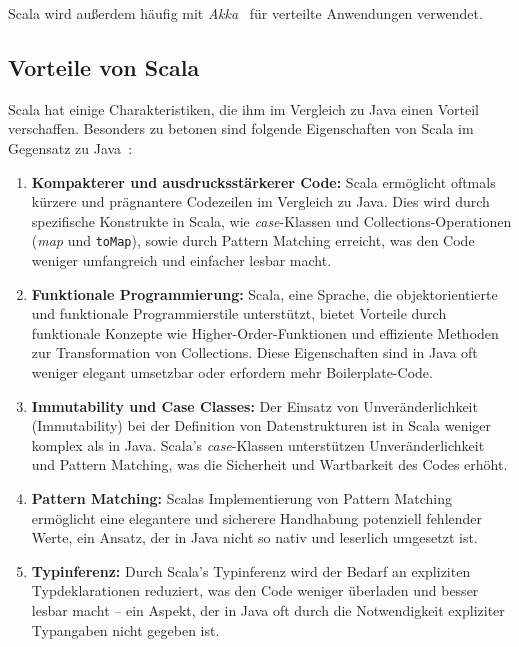 Scala wird außerdem häufig mit \emph{Akka}~\cite{lightbend_akka_nodate} für verteilte Anwendungen verwendet.

\subsection{Vorteile von Scala}
Scala hat einige Charakteristiken, die ihm im Vergleich zu Java einen Vorteil verschaffen.
Besonders zu betonen sind folgende Eigenschaften von Scala im Gegensatz zu Java~\cite{epfl_scala_nodate-1, epfl_scala_nodate-2}: %

\begin{enumerate}
    \item \textbf{Kompakterer und ausdrucksstärkerer Code:} Scala ermöglicht oftmals kürzere und prägnantere Codezeilen im Vergleich zu Java. Dies wird durch spezifische Konstrukte in Scala, wie \emph{case}-Klassen und Collections-Operationen (\emph{map} und \texttt{toMap}), sowie durch Pattern Matching erreicht, was den Code weniger umfangreich und einfacher lesbar macht.
    
    \item \textbf{Funktionale Programmierung:} Scala, eine Sprache, die objektorientierte und funktionale Programmierstile unterstützt, bietet Vorteile durch funktionale Konzepte wie Higher-Order-Funktionen und effiziente Methoden zur Transformation von Collections. Diese Eigenschaften sind in Java oft weniger elegant umsetzbar oder erfordern mehr Boilerplate-Code.
    
    \item \textbf{Immutability und Case Classes:} Der Einsatz von Unveränderlichkeit (Immutability) bei der Definition von Datenstrukturen ist in Scala weniger komplex als in Java. Scala's \emph{case}-Klassen unterstützen Unveränderlichkeit und Pattern Matching, was die Sicherheit und Wartbarkeit des Codes erhöht.
    
    \item \textbf{Pattern Matching:} Scalas Implementierung von Pattern Matching ermöglicht eine elegantere und sicherere Handhabung potenziell fehlender Werte, ein Ansatz, der in Java nicht so nativ und leserlich umgesetzt ist.
    
    \item \textbf{Typinferenz:} Durch Scala's Typinferenz wird der Bedarf an expliziten Typdeklarationen reduziert, was den Code weniger überladen und besser lesbar macht – ein Aspekt, der in Java oft durch die Notwendigkeit expliziter Typangaben nicht gegeben ist.
\end{enumerate}


